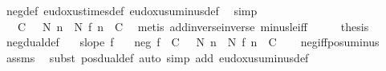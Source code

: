 \begin{isabellebody}
\ neg{\isacharunderscore}{\kern0pt}def\ eudoxus{\isacharunderscore}{\kern0pt}times{\isacharunderscore}{\kern0pt}def\ eudoxus{\isacharunderscore}{\kern0pt}uminus{\isacharunderscore}{\kern0pt}def\ \isamarkupfalse%
\ simp\isanewline
\ \ \isamarkupfalse%
\ \isamarkupfalse%
\ {\isachardoublequoteopen}{\isachardot}{\kern0pt}{\isachardot}{\kern0pt}{\isachardot}{\kern0pt}\ {\isacharequal}{\kern0pt}\ {\isacharparenleft}{\kern0pt}{\isasymforall}C\ {\isasymge}\ {}{\isachardot}{\kern0pt}\ {\isasymexists}N{\isachardot}{\kern0pt}\ {\isasymforall}n\ {\isasymle}\ N{\isachardot}{\kern0pt}\ f\ n\ {\isasymle}\ {\isacharminus}{\kern0pt}C{\isacharparenright}{\kern0pt}{\isachardoublequoteclose}\ \isamarkupfalse%
\ {\isacharparenleft}{\kern0pt}metis\ add{\isachardot}{\kern0pt}inverse{\isacharunderscore}{\kern0pt}inverse\ minus{\isacharunderscore}{\kern0pt}le{\isacharunderscore}{\kern0pt}iff{\isacharparenright}{\kern0pt}\isanewline
\ \ \isamarkupfalse%
\ \isamarkupfalse%
\ {\isacharquery}{\kern0pt}thesis\ \isacommand{{\isachardot}{\kern0pt}}\isamarkupfalse%
\isanewline
{}\isamarkupfalse%
%
\endisatagproof
{\isafoldproof}%
%
\isadelimproof
\isanewline
%
\endisadelimproof
\isanewline
{}\isamarkupfalse%
\ neg{\isacharunderscore}{\kern0pt}dual{\isacharunderscore}{\kern0pt}def{\isacharcolon}{\kern0pt}\isanewline
\ \ \ {\isachardoublequoteopen}slope\ f{\isachardoublequoteclose}\isanewline
\ \ \ {\isachardoublequoteopen}neg\ f\ {\isacharequal}{\kern0pt}\ {\isacharparenleft}{\kern0pt}{\isasymforall}C\ {\isasymge}\ {}{\isachardot}{\kern0pt}\ {\isasymexists}N{\isachardot}{\kern0pt}\ {\isasymforall}n\ {\isasymle}\ N{\isachardot}{\kern0pt}\ f\ n\ {\isasymge}\ C{\isacharparenright}{\kern0pt}{\isachardoublequoteclose}\isanewline
%
\isadelimproof
\ \ %
\endisadelimproof
%
\isatagproof
{}\isamarkupfalse%
\ neg{\isacharunderscore}{\kern0pt}iff{\isacharunderscore}{\kern0pt}pos{\isacharunderscore}{\kern0pt}uminus\ \isamarkupfalse%
\ assms\ \isamarkupfalse%
\ {\isacharparenleft}{\kern0pt}subst\ pos{\isacharunderscore}{\kern0pt}dual{\isacharunderscore}{\kern0pt}def{\isacharparenright}{\kern0pt}\ {\isacharparenleft}{\kern0pt}auto\ simp\ add{\isacharcolon}{\kern0pt}\ eudoxus{\isacharunderscore}{\kern0pt}uminus{\isacharunderscore}{\kern0pt}def{\isacharparenright}{\kern0pt}%
\endisatagproof
{\isafoldproof}%
%
\isadelimproof
\isanewline
%
\endisadelimproof
\isanewline

\end{isabellebody}
